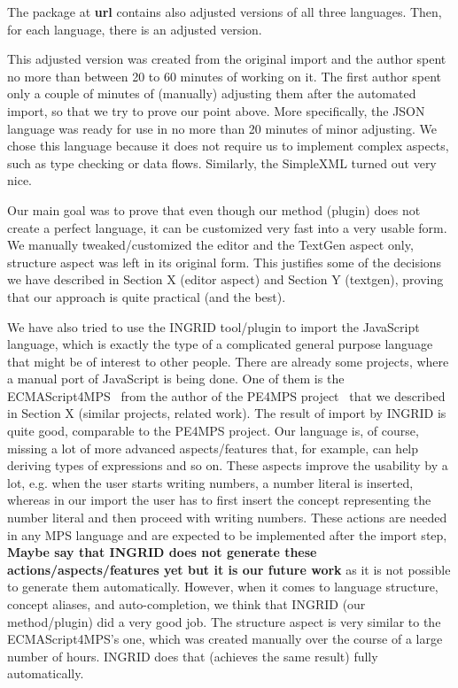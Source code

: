 \documentclass[10pt]{sigplanconf}
\newcommand{\todo}[1]{{\bfseries #1}}
\begin{document}
The package at \todo{url} contains also adjusted versions of all three languages.
Then, for each language, there is an adjusted version.

This adjusted version was created from the original import and the author spent no more than between 20 to 60 minutes of working on it.
The first author spent only a couple of minutes of (manually) adjusting them after the automated import, so that we try to prove our point above.
More specifically, the JSON language was ready for use in no more than 20 minutes of minor adjusting.
We chose this language because it does not require us to implement complex aspects, such as type checking or data flows.
Similarly, the SimpleXML turned out very nice.

Our main goal was to prove that even though our method (plugin) does not create a perfect language, it can be customized very fast into a very usable form.
We manually tweaked/customized the editor and the TextGen aspect only, structure aspect was left in its original form.
This justifies some of the decisions we have described in Section X (editor aspect) and Section Y (textgen), proving that our approach is quite practical (and the best).

We have also tried to use the INGRID tool/plugin to import the JavaScript language, which is exactly the type of a complicated general purpose language that might be of interest to other people.
There are already some projects, where a manual port of JavaScript is being done.
One of them is the ECMAScript4MPS~\cite{ref:ECMAScript4MPS} from the author of the PE4MPS project~\cite{ref:PE4MPS} that we described in Section X (similar projects, related work).
The result of import by INGRID is quite good, comparable to the PE4MPS project.
Our language is, of course, missing a lot of more advanced aspects/features that, for example, can help deriving types of expressions and so on.
These aspects improve the usability by a lot, e.g. when the user starts writing numbers, a number literal is inserted, whereas in our import the user has to first insert the concept representing the number literal and then proceed with writing numbers.
These actions are needed in any MPS language and are expected to be implemented after the import step, \todo{Maybe say that INGRID does not generate these actions/aspects/features yet but it is our future work} as it is not possible to generate them automatically.
However, when it comes to language structure, concept aliases, and auto-completion, we think that INGRID (our method/plugin) did a very good job.
The structure aspect is very similar to the ECMAScript4MPS's one, which was created manually over the course of a large number of hours.
INGRID does that (achieves the same result) fully automatically.
\end{document}
